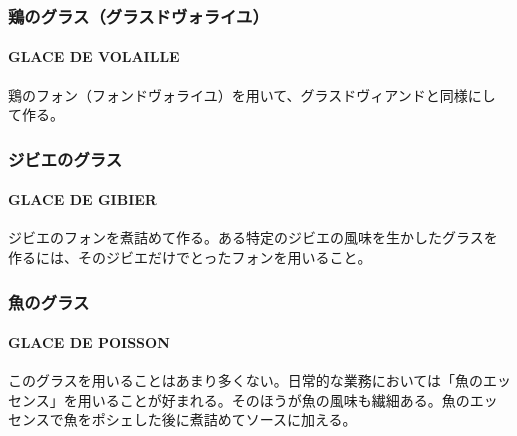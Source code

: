 \documentclass[twoside,12Q,b5j]{escoffierltjsbook}
\newenvironment{recette}{\begin{small}\begin{spacing}{1}\begin{multicols}{2}}{\end{multicols}\end{spacing}\end{small}}
\begin{document}
\begin{recette}
\vspace*{1.7\zw}

\subsubsection{鶏のグラス（グラスドヴォライユ）}\label{ux9d8fux306eux30b0ux30e9ux30b9ux30b0ux30e9ux30b9ux30c9ux30f4ux30a9ux30e9ux30a4ux30e6}

\paragraph{GLACE DE VOLAILLE}\label{glace-de-volaille}


鶏のフォン（フォンドヴォライユ）を用いて、グラスドヴィアンドと同様にし
て作る。

\vspace*{1.7\zw}

\subsubsection{ジビエのグラス}\label{ux30b8ux30d3ux30a8ux306eux30b0ux30e9ux30b9}

\paragraph{GLACE DE GIBIER}\label{glace-de-gibier}


ジビエのフォンを煮詰めて作る。ある特定のジビエの風味を生かしたグラスを
作るには、そのジビエだけでとったフォンを用いること。

\vspace*{1.7\zw}

\subsubsection{魚のグラス}\label{ux9b5aux306eux30b0ux30e9ux30b9}

\paragraph{GLACE DE POISSON}\label{glace-de-poisson}


このグラスを用いることはあまり多くない。日常的な業務においては「魚のエッ
センス」を用いることが好まれる。そのほうが魚の風味も繊細ある。魚のエッ
センスで魚をポシェした後に煮詰めてソースに加える。

\end{recette}
\end{document}
